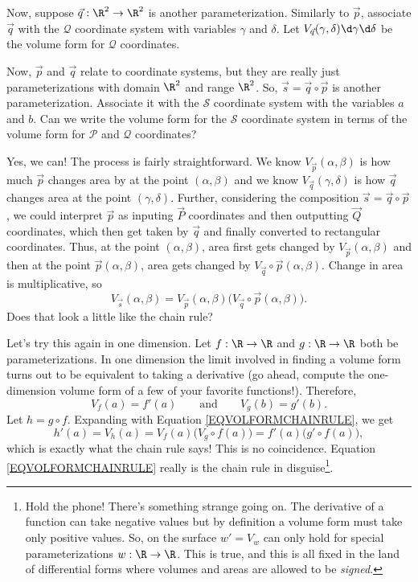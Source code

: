 Now, suppose $\vec q:\R^2\to\R^2$ is another parameterization.  Similarly to $\vec p$, associate
$\vec q$ with the $\mathcal Q$ coordinate system with variables $\gamma$ and $\delta$.  Let
$V_{\vec q}(\gamma,\delta)\d\gamma\d\delta$ be the volume form for $\mathcal Q$ coordinates.

Now, $\vec p$ and $\vec q$ relate to coordinate systems, but they are really just parameterizations with domain
$\R^2$ and range $\R^2$.  So, $\vec s=\vec q\circ \vec p$ is another parameterization.
Associate it with the $\mathcal S$ coordinate system with the variables $a$ and $b$.  Can we write the volume
form for the $\mathcal S$ coordinate system in terms of the volume form for $\mathcal P$ and
$\mathcal Q$ coordinates?

Yes, we can!  The process is fairly straightforward.  We know $V_{\vec p}(\alpha,\beta)$ is how
much $\vec p$ changes area by at the point $(\alpha,\beta)$ and we know $V_{\vec q}(\gamma,\delta)$
is how $\vec q$ changes area at the point $(\gamma,\delta)$.  Further, considering the composition
$\vec s=\vec q\circ \vec p$, we could interpret $\vec p$ as inputing $\vec P$ coordinates and then
outputting $\vec Q$ coordinates, which then get taken by $\vec q$ and finally converted to rectangular coordinates.
Thus, at the point $(\alpha,\beta)$, area first gets changed by $V_{\vec p}(\alpha,\beta)$
and then at the point $\vec p(\alpha,\beta)$, area gets changed by $V_{\vec q}\circ \vec p(\alpha,\beta)$.
Change in area is multiplicative, so
\begin{equation}
	\label{EQVOLFORMCHAINRULE}
	V_{\vec s}(\alpha,\beta) = V_{\vec p}(\alpha,\beta)\Big(V_{\vec q}\circ \vec p(\alpha,\beta)\Big).
\end{equation}
Does that look a little like the chain rule?

Let's try this again in one dimension.  Let $f:\R\to\R$ and $g:\R\to\R$ both be parameterizations.
In one dimension the limit involved in finding a volume form turns out to be equivalent to taking
a derivative (go ahead, compute the one-dimension volume form of a few of your favorite functions!).
Therefore,
\[
	V_{f}(a) = f'(a)\qquad\text{and}\qquad V_{g}(b) = g'(b).
\]
Let $h=g\circ f$.  Expanding with Equation \eqref{EQVOLFORMCHAINRULE}, we get
\[
	h'(a) = V_{h}(a) = V_f(a)\Big(V_g\circ f(a)\Big) = f'(a)\Big(g'\circ f(a)\Big),
\]
which is exactly what the chain rule says!  This is no coincidence. Equation
\eqref{EQVOLFORMCHAINRULE} really is the chain rule in disguise\footnote{ 
Hold the phone!  There's something strange going on.  The derivative
of a function can take negative values but by definition a volume form must take only
positive values.  So, on the surface $w'=V_{w}$ can only hold for special parameterizations
$w:\R\to\R$.  This is true, and this is all fixed in the land of differential forms
where volumes and areas are allowed to be \emph{signed}.}.  

